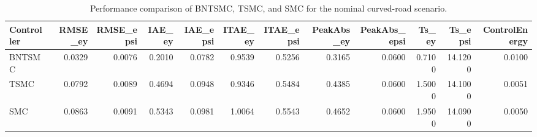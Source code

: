 \begin{table}
\caption{Performance comparison of BNTSMC, TSMC, and SMC for the nominal curved-road scenario.}
\label{tab:lane_fig6_metrics}
\begin{tabular}{lrrrrrrrrrrr}
\toprule
Controller & RMSE_ey & RMSE_epsi & IAE_ey & IAE_epsi & ITAE_ey & ITAE_epsi & PeakAbs_ey & PeakAbs_epsi & Ts_ey & Ts_epsi & ControlEnergy \\
\midrule
BNTSMC & 0.0329 & 0.0076 & 0.2010 & 0.0782 & 0.9539 & 0.5256 & 0.3165 & 0.0600 & 0.7100 & 14.1200 & 0.0100 \\
TSMC & 0.0792 & 0.0089 & 0.4694 & 0.0948 & 0.9346 & 0.5484 & 0.4385 & 0.0600 & 1.5000 & 14.1000 & 0.0051 \\
SMC & 0.0863 & 0.0091 & 0.5343 & 0.0981 & 1.0064 & 0.5543 & 0.4652 & 0.0600 & 1.9500 & 14.0900 & 0.0050 \\
\bottomrule
\end{tabular}
\end{table}
